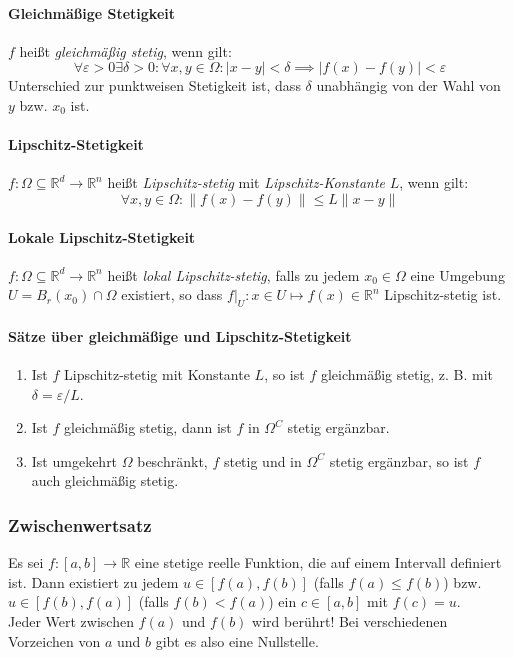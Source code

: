 \documentclass[a4paper, 9pt, DIV=24]{scrartcl}
\newcommand{\R}{\mathbb{R}}
\begin{document}
\paragraph{Gleichmäßige Stetigkeit}
$f$ heißt \emph{gleichmäßig stetig}, wenn gilt:
\[\forall\varepsilon>0\exists\delta>0: \forall x,y \in \Omega: |x-y| < \delta \implies |f(x) - f(y)| < \varepsilon \]
Unterschied zur punktweisen Stetigkeit ist, dass $\delta$ unabhängig von der Wahl von $y$ bzw. $x_0$ ist.

\paragraph{Lipschitz-Stetigkeit}
$f: \Omega \subseteq \R^d \rightarrow \R^n$ heißt \emph{Lipschitz-stetig} mit \emph{Lipschitz-Konstante} $L$, wenn gilt:
\[ \forall x,y\in\Omega: \|f(x)-f(y)\| \leq L\|x-y\|\]

\paragraph{Lokale Lipschitz-Stetigkeit}
$f: \Omega \subseteq \R^d \rightarrow \R^n$ heißt \emph{lokal Lipschitz-stetig},
falls zu jedem $x_0\in\Omega$ eine Umgebung $U = B_r(x_0)\cap\Omega$ existiert,
so dass $f|_U : x \in U \mapsto f(x) \in \R^n$ Lipschitz-stetig ist.


\paragraph{Sätze über gleichmäßige und Lipschitz-Stetigkeit}
\begin{enumerate}[label={(}\arabic*{)}]
 \item Ist $f$ Lipschitz-stetig mit Konstante $L$, so ist $f$ gleichmäßig stetig, z. B. mit $\delta = \varepsilon/L$.
 \item Ist $f$ gleichmäßig stetig, dann ist $f$ in $\Omega^C$ stetig ergänzbar.
 \item Ist umgekehrt $\Omega$ beschränkt, $f$ stetig und in $\Omega^C$ stetig ergänzbar, so ist $f$ auch gleichmäßig stetig.
\end{enumerate}

\subsubsection{Zwischenwertsatz}
Es sei $f: [a,b] \to \R$ eine stetige reelle Funktion, die auf einem Intervall definiert ist.
Dann existiert zu jedem $u\in [f(a), f(b)]$ (falls $f(a)\leq f(b)$) bzw. $u\in [f(b), f(a)]$ (falls $f(b)< f(a)$) ein $c\in [a,b]$ mit $f\left(c\right)=u$. \\
     Jeder Wert zwischen $f(a)$ und $f(b)$ wird berührt! Bei verschiedenen Vorzeichen von $a$ und $b$ gibt es also eine Nullstelle.
\end{document}
